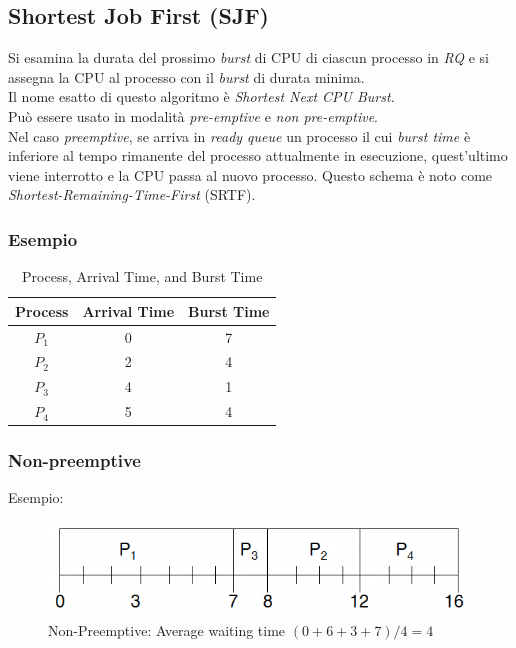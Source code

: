 \subsection{Shortest Job First (SJF)}
Si esamina la durata del prossimo \textit{burst} di CPU di ciascun processo in \textit{RQ} e si assegna la CPU al processo con il \textit{burst} di durata minima.\\
Il nome esatto di questo algoritmo è \textit{Shortest Next CPU Burst}.\\
 Può essere usato in modalità \textit{pre-emptive} e \textit{non pre-emptive}.\\
Nel caso \textit{preemptive}, se arriva in \textit{ready queue} un processo il cui \textit{burst time} è inferiore al tempo rimanente del processo attualmente in esecuzione, quest'ultimo viene interrotto e la CPU passa al nuovo processo. Questo schema è noto come \textit{Shortest-Remaining-Time-First} (SRTF).\\
\subsubsection{Esempio}
\begin{table}[ht]
    \centering
    \begin{tabular}{|c|c|c|}
        \hline
        \rowcolor[gray]{0.6} 
        Process & Arrival Time & Burst Time \\
        \hline
        $P_1$ & 0 & 7 \\
        $P_2$ & 2 & 4 \\
        $P_3$ & 4 & 1 \\
        $P_4$ & 5 & 4 \\
        \hline
    \end{tabular}
    \caption{Process, Arrival Time, and Burst Time}
    \label{tab:process_times}
\end{table}

\subsubsection{Non-preemptive}
Esempio:
\begin{figure}[ht]
    \centering
    \includegraphics[width=0.2\linewidth]{images/SJF_nonpreemptive.png}
    \caption{Non-Preemptive: Average waiting time $(0 + 6 + 3 + 7)/4 = 4$}
\end{figure}

